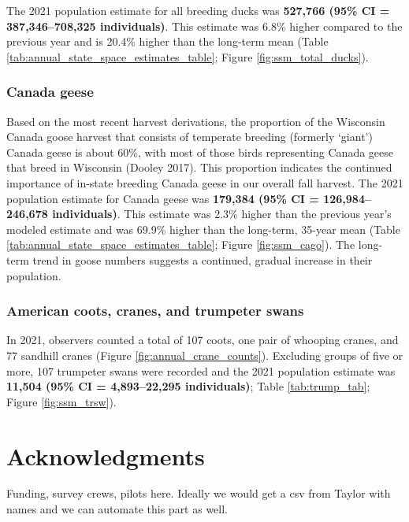 \documentclass[
  12pt,
]{article}
\begin{document}
The 2021 population estimate for all breeding ducks was \textbf{527,766
(95\% CI = 387,346--708,325 individuals)}. This estimate was 6.8\%
higher compared to the previous year and is 20.4\% higher than the
long-term mean (Table \ref{tab:annual_state_space_estimates_table};
Figure \ref{fig:ssm_total_ducks}).

\hypertarget{canada-geese}{%
\subsubsection{Canada geese}\label{canada-geese}}

Based on the most recent harvest derivations, the proportion of the
Wisconsin Canada goose harvest that consists of temperate breeding
(formerly `giant') Canada geese is about 60\%, with most of those birds
representing Canada geese that breed in Wisconsin (Dooley 2017). This
proportion indicates the continued importance of in-state breeding
Canada geese in our overall fall harvest. The 2021 population estimate
for Canada geese was \textbf{179,384 (95\% CI = 126,984--246,678
individuals)}. This estimate was 2.3\% higher than the previous year's
modeled estimate and was 69.9\% higher than the long-term, 35-year mean
(Table \ref{tab:annual_state_space_estimates_table}; Figure
\ref{fig:ssm_cago}). The long-term trend in goose numbers suggests a
continued, gradual increase in their population.

\hypertarget{american-coots-cranes-and-trumpeter-swans}{%
\subsubsection{American coots, cranes, and trumpeter
swans}\label{american-coots-cranes-and-trumpeter-swans}}

In 2021, observers counted a total of 107 coots, one pair of whooping
cranes, and 77 sandhill cranes (Figure \ref{fig:annual_crane_counts}).
Excluding groups of five or more, 107 trumpeter swans were recorded and
the 2021 population estimate was \textbf{11,504 (95\% CI = 4,893--22,295
individuals)}; Table \ref{tab:trump_tab}; Figure \ref{fig:ssm_trsw}).

\newpage

\hypertarget{acknowledgments}{%
\section{Acknowledgments}\label{acknowledgments}}

Funding, survey crews, pilots here. Ideally we would get a csv from
Taylor with names and we can automate this part as well.
\end{document}
